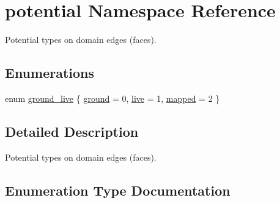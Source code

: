 \hypertarget{namespacepotential}{}\section{potential Namespace Reference}
\label{namespacepotential}


Potential types on domain edges (faces).  


\subsection*{Enumerations}
\begin{DoxyCompactItemize}
\item 
enum \hyperlink{namespacepotential_a22249d745e66b412864d893590d05b21}{ground\+\_\+live} \{ \hyperlink{namespacepotential_a22249d745e66b412864d893590d05b21a7021de2cbd9c01baaa9efc7427abac3e}{ground} = 0, 
\hyperlink{namespacepotential_a22249d745e66b412864d893590d05b21a4d82e18dd4ef4287d64d25b71770fed2}{live} = 1, 
\hyperlink{namespacepotential_a22249d745e66b412864d893590d05b21a258f5d3f3c54b96ebb4fc1eff63fda41}{mapped} = 2
 \}
\end{DoxyCompactItemize}


\subsection{Detailed Description}
Potential types on domain edges (faces). 

\subsection{Enumeration Type Documentation}
